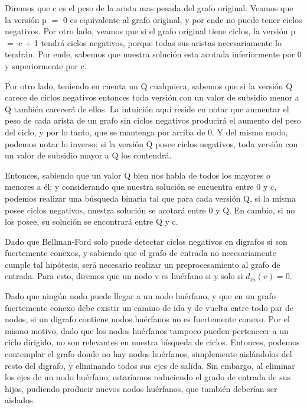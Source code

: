Diremos que c es el peso de la arista mas pesada del grafo original. Veamos que la versión p $=$ 0 es equivalente al grafo original, y por ende no puede tener ciclos negativos. Por otro lado, veamos que si el grafo original tiene ciclos, la versión p $=$ c + 1 tendrá ciclos negativos, porque todas sus aristas necesariamente lo tendrán. Por ende, sabemos que nuestra solución esta acotada inferiormente por 0 y superiormente por c.
\\
\par
Por otro lado, teniendo en cuenta un Q cualquiera, sabemos que si la versión Q carece de ciclos negativos entonces toda versión con un valor de subsidio menor a Q también carecerá de ellos. La intuición aquí reside en notar que aumentar el peso de cada arista de un grafo sin ciclos negativos producirá el aumento del peso del ciclo, y por lo tanto, que se mantenga por arriba de 0. Y del mismo modo, podemos notar lo inverso: si la versión Q posee ciclos negativos, toda versión con un valor de subsidio mayor a Q los contendrá.
\\
\par
Entonces, sabiendo que un valor Q bien nos habla de todos los mayores o menores a él; y considerando que nuestra solución se encuentra entre 0 y c, podemos realizar una búsqueda binaria tal que para cada versión Q, si la misma posee ciclos negativos, nuestra solución se acotará entre 0 y Q. En cambio, si no los posee, su solución se encontrará entre Q y c.
\\
\par
Dado que Bellman-Ford solo puede detectar ciclos negativos en digrafos si son fuertemente conexos, y sabiendo que el grafo de entrada no necesariamente cumple tal hipótesis, será necesario realizar un preprocesamiento al grafo de entrada. Para esto, diremos que un nodo v es huérfano si y solo si $d_{in} (v) = 0$.
\\
\par
Dado que ningún nodo puede llegar a un nodo huérfano, y que en un grafo fuertemente conexo debe existir un camino de ida y de vuelta entre todo par de nodos, si un digrafo contiene nodos huérfanos no es fuertemente conexo. Por el mismo motivo, dado que los nodos huérfanos tampoco pueden pertenecer a un ciclo dirigido, no son relevantes en nuestra bísqueda de ciclos. Entonces, podemos contemplar el grafo donde no hay nodos huérfanos, simplemente aislándolos del resto del digrafo, y eliminando todos sus ejes de salida. Sin embargo, al eliminar los ejes de un nodo huérfano, estaríamos reduciendo el grado de entrada de sus hijos, pudiendo producir nuevos nodos huérfanos, que también deberían ser aislados.
